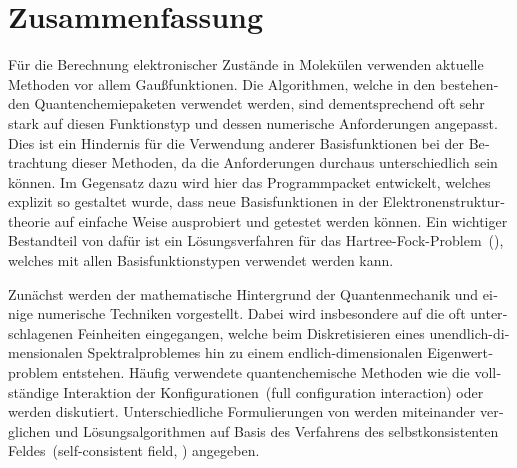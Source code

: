 %
%
\chapter*{Zusammenfassung}
{}

\begin{otherlanguage}{ngerman}
Für die Berechnung elektronischer Zustände in Molekülen
verwenden aktuelle Methoden vor allem Gaußfunktionen.
Die Algorithmen, welche in den bestehenden Quantenchemiepaketen
verwendet werden, sind dementsprechend oft sehr stark
auf diesen Funktionstyp und dessen numerische Anforderungen angepasst.
Dies ist ein Hindernis für die Verwendung
anderer Basisfunktionen bei der Betrachtung dieser Methoden,
da die Anforderungen durchaus unterschiedlich sein können.
Im Gegensatz dazu wird hier
das Programmpacket \molsturm entwickelt,
welches explizit so gestaltet wurde,
dass neue Basisfunktionen in der Elektronenstrukturtheorie
auf einfache Weise ausprobiert und getestet werden können.
Ein wichtiger Bestandteil von \molsturm dafür ist
ein Lösungsverfahren für das Hartree-Fock-Problem~(\HF),
welches mit allen Basisfunktionstypen verwendet werden kann.

Zunächst werden der mathematische Hintergrund der Quantenmechanik
und einige numerische Techniken vorgestellt.
Dabei wird insbesondere auf die oft unterschlagenen Feinheiten eingegangen,
welche beim Diskretisieren eines unendlich-dimensionalen Spektralproblemes
hin zu einem endlich-dimensionalen Eigenwertproblem entstehen.
Häufig verwendete quantenchemische Methoden
wie die vollständige Interaktion der Konfigurationen~(full configuration interaction)
oder \HF werden diskutiert.
Unterschiedliche Formulierungen von \HF werden miteinander verglichen
und
Lösungsalgorithmen auf Basis des Verfahrens des
selbstkonsistenten Feldes~(self-consistent field, \SCF) angegeben.


\end{otherlanguage}
